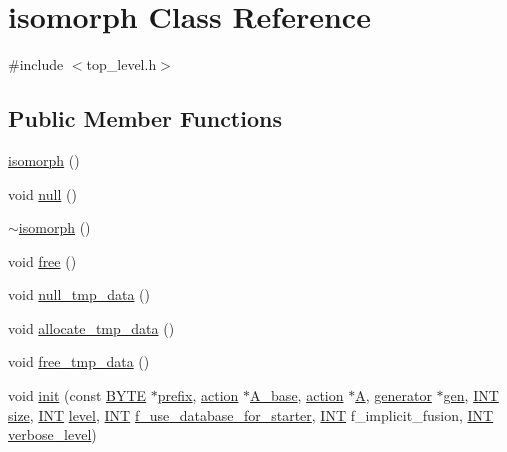 \hypertarget{classisomorph}{}\section{isomorph Class Reference}
\label{classisomorph}


{\ttfamily \#include $<$top\+\_\+level.\+h$>$}

\subsection*{Public Member Functions}
\begin{DoxyCompactItemize}
\item 
\mbox{\hyperlink{classisomorph_aedaab5a96e9f9aaf97bfbca9fafe10bc}{isomorph}} ()
\item 
void \mbox{\hyperlink{classisomorph_a8212fe560851abbc45a12b866694e321}{null}} ()
\item 
\mbox{\hyperlink{classisomorph_a640a6e2ba514b0f832685dc4f3c51fc6}{$\sim$isomorph}} ()
\item 
void \mbox{\hyperlink{classisomorph_ab34f53c7a2cc10355c0e5f525a64e409}{free}} ()
\item 
void \mbox{\hyperlink{classisomorph_a169534be12152d9c663bb85fb422951c}{null\+\_\+tmp\+\_\+data}} ()
\item 
void \mbox{\hyperlink{classisomorph_a2aba74f4e4c524cfee6c9faea33474c2}{allocate\+\_\+tmp\+\_\+data}} ()
\item 
void \mbox{\hyperlink{classisomorph_a353df9e8529d3bde3f9ce96e6dbd2566}{free\+\_\+tmp\+\_\+data}} ()
\item 
void \mbox{\hyperlink{classisomorph_ad10f09aafccb67e0871404d61a68e0d9}{init}} (const \mbox{\hyperlink{galois_8h_ab6cc7b4aeb6ea31aba2b3fbfc83ff5e6}{B\+Y\+TE}} $\ast$\mbox{\hyperlink{classisomorph_a8438e383d6c346392fc2fc5a0906d7eb}{prefix}}, \mbox{\hyperlink{classaction}{action}} $\ast$\mbox{\hyperlink{classisomorph_a045c434453d3a159aeeedbed33d23b5e}{A\+\_\+base}}, \mbox{\hyperlink{classaction}{action}} $\ast$\mbox{\hyperlink{classisomorph_a396591abf9126903999a0df60ac1e398}{A}}, \mbox{\hyperlink{classgenerator}{generator}} $\ast$\mbox{\hyperlink{classisomorph_afb02cf301a3151bac0153761b5aefe85}{gen}}, \mbox{\hyperlink{galois_8h_a09fddde158a3a20bd2dcadb609de11dc}{I\+NT}} \mbox{\hyperlink{classisomorph_aaf000e8a442c4b08d230f7502cf06c13}{size}}, \mbox{\hyperlink{galois_8h_a09fddde158a3a20bd2dcadb609de11dc}{I\+NT}} \mbox{\hyperlink{classisomorph_a95cd884738d351f31d8688b49c783dee}{level}}, \mbox{\hyperlink{galois_8h_a09fddde158a3a20bd2dcadb609de11dc}{I\+NT}} \mbox{\hyperlink{classisomorph_a52a672cae28d841d56e07b6c53566532}{f\+\_\+use\+\_\+database\+\_\+for\+\_\+starter}}, \mbox{\hyperlink{galois_8h_a09fddde158a3a20bd2dcadb609de11dc}{I\+NT}} f\+\_\+implicit\+\_\+fusion, \mbox{\hyperlink{galois_8h_a09fddde158a3a20bd2dcadb609de11dc}{I\+NT}} \mbox{\hyperlink{simeon_8_c_a818073fbcc2f439e7c56952f67386122}{verbose\+\_\+level}})

\end{DoxyCompactItemize}
